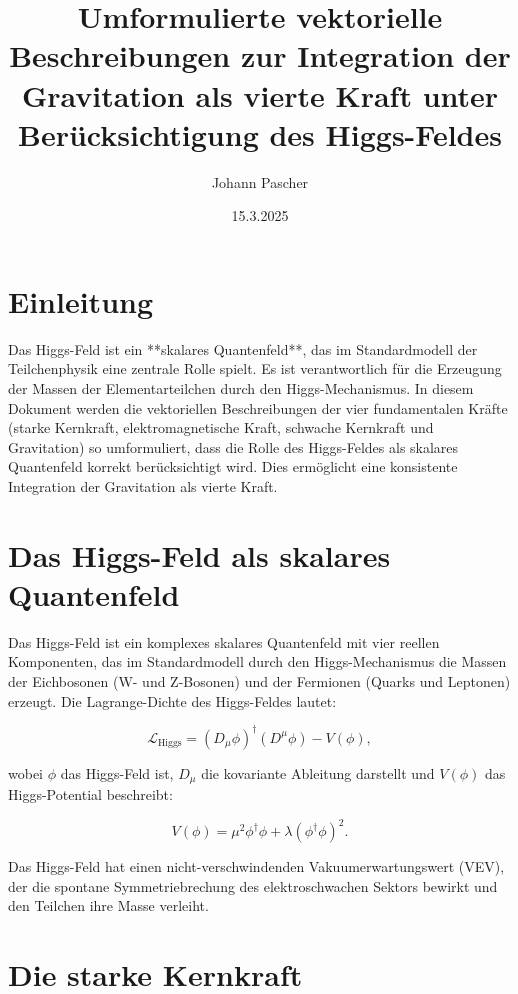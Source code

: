 \documentclass{article}
\title{Umformulierte vektorielle Beschreibungen zur Integration der Gravitation als vierte Kraft unter Berücksichtigung des Higgs-Feldes}
\author{Johann Pascher}
\date{15.3.2025}
\begin{document}
	
	\maketitle
	
	\section{Einleitung}
	
	Das Higgs-Feld ist ein **skalares Quantenfeld**, das im Standardmodell der Teilchenphysik eine zentrale Rolle spielt. Es ist verantwortlich für die Erzeugung der Massen der Elementarteilchen durch den Higgs-Mechanismus. In diesem Dokument werden die vektoriellen Beschreibungen der vier fundamentalen Kräfte (starke Kernkraft, elektromagnetische Kraft, schwache Kernkraft und Gravitation) so umformuliert, dass die Rolle des Higgs-Feldes als skalares Quantenfeld korrekt berücksichtigt wird. Dies ermöglicht eine konsistente Integration der Gravitation als vierte Kraft.
	
	\section{Das Higgs-Feld als skalares Quantenfeld}
	
	Das Higgs-Feld ist ein komplexes skalares Quantenfeld mit vier reellen Komponenten, das im Standardmodell durch den Higgs-Mechanismus die Massen der Eichbosonen (W- und Z-Bosonen) und der Fermionen (Quarks und Leptonen) erzeugt. Die Lagrange-Dichte des Higgs-Feldes lautet:
	
	\begin{equation}
		\mathcal{L}_\text{Higgs} = (D_\mu \phi)^\dagger (D^\mu \phi) - V(\phi),
	\end{equation}
	
	wobei $\phi$ das Higgs-Feld ist, $D_\mu$ die kovariante Ableitung darstellt und $V(\phi)$ das Higgs-Potential beschreibt:
	
	\begin{equation}
		V(\phi) = \mu^2 \phi^\dagger \phi + \lambda (\phi^\dagger \phi)^2.
	\end{equation}
	
	Das Higgs-Feld hat einen nicht-verschwindenden Vakuumerwartungswert (VEV), der die spontane Symmetriebrechung des elektroschwachen Sektors bewirkt und den Teilchen ihre Masse verleiht.
	
	\section{Die starke Kernkraft}
	
\end{document}
